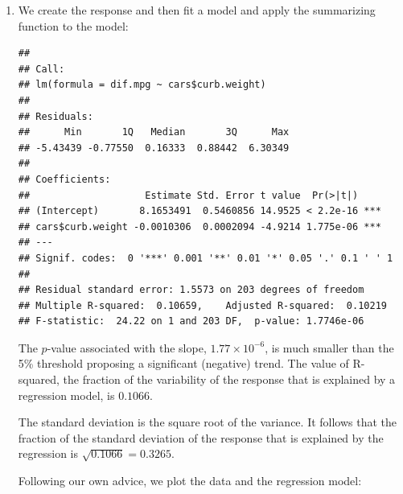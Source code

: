 \documentclass[]{krantz}
\makeatletter
\newenvironment{Shaded}{\begin{snugshade}}{\end{snugshade}}
\newcommand{\KeywordTok}[1]{\textcolor[rgb]{0.13,0.29,0.53}{\textbf{#1}}}
\newcommand{\StringTok}[1]{\textcolor[rgb]{0.31,0.60,0.02}{#1}}
\newcommand{\OperatorTok}[1]{\textcolor[rgb]{0.81,0.36,0.00}{\textbf{#1}}}
\newcommand{\NormalTok}[1]{#1}
\newenvironment{kframe}{%
\medskip{}
\setlength{\fboxsep}{.8em}
 \def\at@end@of@kframe{}%
 \ifinner\ifhmode%
  \def\at@end@of@kframe{\end{minipage}}%
  \begin{minipage}{\columnwidth}%
 \fi\fi%
 \def\FrameCommand##1{\hskip\@totalleftmargin \hskip-\fboxsep
 \colorbox{shadecolor}{##1}\hskip-\fboxsep
     \hskip-\linewidth \hskip-\@totalleftmargin \hskip\columnwidth}%
 \MakeFramed {\advance\hsize-\width
   \@totalleftmargin\z@ \linewidth\hsize
   \@setminipage}}%
 {\par\unskip\endMakeFramed%
 \at@end@of@kframe}
\renewenvironment{Shaded}{\begin{kframe}}{\end{kframe}}
\theoremstyle{definition}
\theoremstyle{definition}
\theoremstyle{definition}
\theoremstyle{remark}
\makeatother
\begin{document}
\begin{enumerate}
\def\labelenumi{\arabic{enumi}.}
\item
  We create the response and then fit a model and apply the summarizing
  function to the model:

\begin{Shaded}
\end{Shaded}

\begin{verbatim}
## 
## Call:
## lm(formula = dif.mpg ~ cars$curb.weight)
## 
## Residuals:
##      Min       1Q   Median       3Q      Max 
## -5.43439 -0.77550  0.16333  0.88442  6.30349 
## 
## Coefficients:
##                    Estimate Std. Error t value  Pr(>|t|)    
## (Intercept)       8.1653491  0.5460856 14.9525 < 2.2e-16 ***
## cars$curb.weight -0.0010306  0.0002094 -4.9214 1.775e-06 ***
## ---
## Signif. codes:  0 '***' 0.001 '**' 0.01 '*' 0.05 '.' 0.1 ' ' 1
## 
## Residual standard error: 1.5573 on 203 degrees of freedom
## Multiple R-squared:  0.10659,    Adjusted R-squared:  0.10219 
## F-statistic:  24.22 on 1 and 203 DF,  p-value: 1.7746e-06
\end{verbatim}

  The \(p\)-value associated with the slope, \(1.77\times 10^{-6}\), is
  much smaller than the 5\% threshold proposing a significant (negative)
  trend. The value of R-squared, the fraction of the variability of the
  response that is explained by a regression model, is \(0.1066\).

  The standard deviation is the square root of the variance. It follows
  that the fraction of the standard deviation of the response that is
  explained by the regression is \(\sqrt{0.1066}= 0.3265\).

  Following our own advice, we plot the data and the regression model:

\begin{Shaded}
\end{Shaded}


\end{enumerate}
\end{document}
